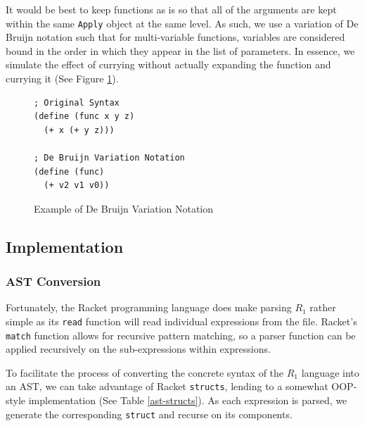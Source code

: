 \documentclass[12pt]{article}
\newcommand{\R}{\ensuremath{\mathit{R_{1}}}}
\newcommand{\key}[1]{\texttt{#1}}
\begin{document}
It would be best to keep functions as is so that all of the arguments are kept within the same \key{Apply} object at the same level. As such, we use a variation of De Bruijn notation such that for multi-variable functions, variables are considered bound in the order in which they appear in the list of parameters. In essence, we simulate the effect of currying without actually expanding the function and currying it (See Figure \ref{debruijn-variation}).

\begin{figure}[H]
  \begin{mdframed}
    \begin{lstlisting}[escapechar=\%]
; Original Syntax
(define (func x y z)
  (+ x (+ y z)))

; De Bruijn Variation Notation
(define (func)
  (+ v2 v1 v0))
    \end{lstlisting}
  \end{mdframed}
  \caption{Example of De Bruijn Variation Notation}
  \label{debruijn-variation}
\end{figure}

\subsection{Implementation}
\subsubsection{AST Conversion}
Fortunately, the Racket programming language does make parsing \R{} rather simple as its \key{read} function will read individual expressions from the file. Racket's \key{match} function allows for recursive pattern matching, so a parser function can be applied recursively on the sub-expressions within expressions.

\hfill

To facilitate the process of converting the concrete syntax of the \R{} language into an AST, we can take advantage of Racket \key{structs}, lending to a somewhat OOP-style implementation (See Table \ref{ast-structs}). As each expression is parsed, we generate the corresponding \key{struct} and recurse on its components.
\end{document}

